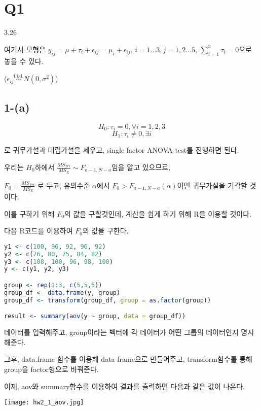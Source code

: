 \documentclass{article}
\begin{document}
\pagestyle{fancy}


\section{Q1} 

3.26

여기서 모형은 
$y_{ij} = \mu + \tau_i + \epsilon_{ij} = \mu_i + \epsilon_{ij} $, $i = 1...3, j = 1, 2... 5$, $\sum_{i=1}^3 \tau_i = 0 $으로 놓을 수 있다.

($\epsilon_{ij}  \overset{\text{i.i.d.}}{\sim} N(0, \sigma^2)$)


\subsection{1-(a)}

$$H_0 : \tau_i = 0 , \forall i = 1, 2, 3$$ 
$$H_1 :  \tau_i \neq 0, \exists i$$

로 귀무가설과 대립가설을 세우고, single factor ANOVA test를 진행하면 된다.

우리는 $H_0$하에서 $\frac{MS_{Trt}}{MS_E} \sim F_{a-1, N-a} $임을 알고 있으므로,

$F_0 = \frac{MS_{Trt}}{MS_E}$ 로 두고,  유의수준 $\alpha$에서 $F_0 > F_{a-1, N-a}(\alpha)$이면 귀무가설을 기각할 것이다.

이를 구하기 위해 $F_0$의 값을 구할것인데, 계산을 쉽게 하기 위해 R을 이용할 것이다.

다음 R코드를 이용하여 $F_0$의 값을 구한다.


\begin{lstlisting}[language=R]
y1 <- c(100, 96, 92, 96, 92)
y2 <- c(76, 80, 75, 84, 82)
y3 <- c(108, 100, 96, 98, 100)
y <- c(y1, y2, y3)

group <- rep(1:3, c(5,5,5))
group_df <- data.frame(y, group)
group_df <- transform(group_df, group = as.factor(group))

result <- summary(aov(y ~ group, data = group_df))
\end{lstlisting}

데이터를 입력해주고, group이라는 벡터에 각 데이터가 어떤 그룹의 데이터인지 명시해준다.

그후, data.frame 함수를 이용해 data frame으로 만들어주고, transform함수를 통해 group을 factor형으로 바꿔준다.

이제, aov와 summary함수를 이용하여 결과를 출력하면 다음과 같은 값이 나온다.

\begin{center}
    \texttt{[image: hw2\_1\_aov.jpg]}
\end{center} 
\end{document}

